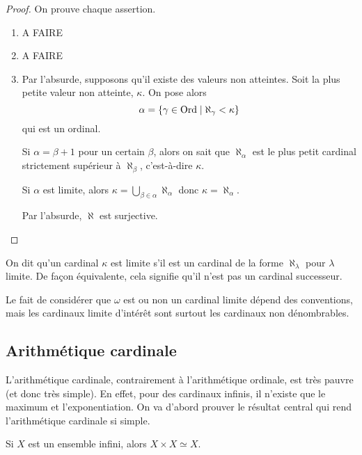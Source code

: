 \begin{proof}
  On prouve chaque assertion.
  \begin{enumerate}[label=(\roman*)]
  \item A FAIRE
  \item A FAIRE
  \item Par l'absurde, supposons qu'il existe des valeurs non atteintes. Soit la
    plus petite valeur non atteinte, $\kappa$. On pose alors
    \[\alpha = \{\gamma \in \operatorname{Ord} \mid \aleph_\gamma < \kappa\}\]
    qui est un ordinal.
    
    Si $\alpha = \beta + 1$ pour un certain $\beta$, alors on sait que
    $\aleph_{\alpha}$ est le plus petit cardinal strictement supérieur à
    $\aleph_\beta$, c'est-à-dire $\kappa$.
    
    Si $\alpha$ est limite, alors
    $\displaystyle\kappa = \bigcup_{\beta \in \alpha} \aleph_\alpha$
    donc $\kappa = \aleph_\alpha$.

    Par l'absurde, $\aleph$ est surjective.
  \end{enumerate}
\end{proof}

\begin{definition}
  On dit qu'un cardinal $\kappa$ est limite s'il est un cardinal de la forme
  $\aleph_{\lambda}$ pour $\lambda$ limite. De façon équivalente, cela signifie
  qu'il n'est pas un cardinal successeur.
\end{definition}

\begin{remark}
  Le fait de considérer que $\omega$ est ou non un cardinal limite dépend des
  conventions, mais les cardinaux limite d'intérêt sont surtout les cardinaux
  non dénombrables.
\end{remark}

\subsection{Arithmétique cardinale}

L'arithmétique cardinale, contrairement à l'arithmétique ordinale, est très
pauvre (et donc très simple). En effet, pour des cardinaux infinis, il n'existe
que le maximum et l'exponentiation. On va d'abord prouver le résultat central
qui rend l'arithmétique cardinale si simple.

\begin{theorem}[Hessenberg]
  Si $X$ est un ensemble infini, alors $X\times X \simeq X$.
\end{theorem}

